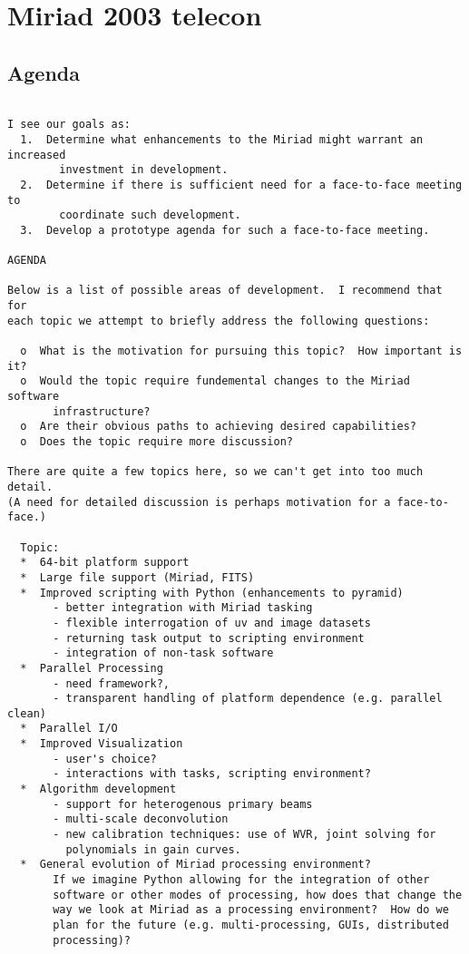 \section{Miriad 2003 telecon}

\subsection{Agenda}

\begin{verbatim}

I see our goals as:
  1.  Determine what enhancements to the Miriad might warrant an increased
        investment in development.
  2.  Determine if there is sufficient need for a face-to-face meeting to 
        coordinate such development.
  3.  Develop a prototype agenda for such a face-to-face meeting.

AGENDA

Below is a list of possible areas of development.  I recommend that for 
each topic we attempt to briefly address the following questions:

  o  What is the motivation for pursuing this topic?  How important is it? 
  o  Would the topic require fundemental changes to the Miriad software 
       infrastructure?  
  o  Are their obvious paths to achieving desired capabilities?
  o  Does the topic require more discussion?

There are quite a few topics here, so we can't get into too much detail.  
(A need for detailed discussion is perhaps motivation for a face-to-face.)  

  Topic:
  *  64-bit platform support
  *  Large file support (Miriad, FITS)
  *  Improved scripting with Python (enhancements to pyramid)
       - better integration with Miriad tasking
       - flexible interrogation of uv and image datasets
       - returning task output to scripting environment
       - integration of non-task software
  *  Parallel Processing
       - need framework?, 
       - transparent handling of platform dependence (e.g. parallel clean)
  *  Parallel I/O
  *  Improved Visualization
       - user's choice?  
       - interactions with tasks, scripting environment?
  *  Algorithm development
       - support for heterogenous primary beams
       - multi-scale deconvolution
       - new calibration techniques: use of WVR, joint solving for
         polynomials in gain curves.
  *  General evolution of Miriad processing environment?
       If we imagine Python allowing for the integration of other
       software or other modes of processing, how does that change the
       way we look at Miriad as a processing environment?  How do we
       plan for the future (e.g. multi-processing, GUIs, distributed
       processing)?




\end{verbatim}

